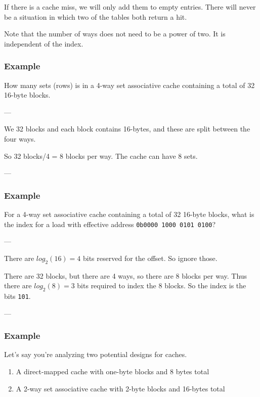 \documentclass{article}
\begin{document}
If there is a cache miss, we will only add them to empty entries. There will never be a situation in which two of the tables both return a hit.

Note that the number of ways does not need to be a power of two. It is independent of the index. 

\subsubsection*{Example}

How many sets (rows) is in a 4-way set associative cache containing a total of 32 16-byte blocks.

---

We 32 blocks and each block contains 16-bytes, and these are split between the four ways. 

So 32 blocks/4 = 8 blocks per way. The cache can have 8 sets. 


---

\subsubsection*{Example}

For a 4-way set associative cache containing a total of 32 16-byte blocks, what is the index for a load with effective address \texttt{0b0000 1000 0101 0100}?

---

There are $log_2(16) = 4$ bits reserved for the offset. So ignore those.

There are 32 blocks, but there are 4 ways, so there are 8 blocks per way. Thus there are $log_2(8) = 3$ bits required to index the 8 blocks. So the index is the bits \texttt{101}.


---

\subsubsection*{Example}

Let's say you're analyzing two potential designs for caches.

\begin{enumerate}
\item A direct-mapped cache with one-byte blocks and 8 bytes total

\item A 2-way set associative cache with 2-byte blocks and 16-bytes total
\end{enumerate}
\end{document}
